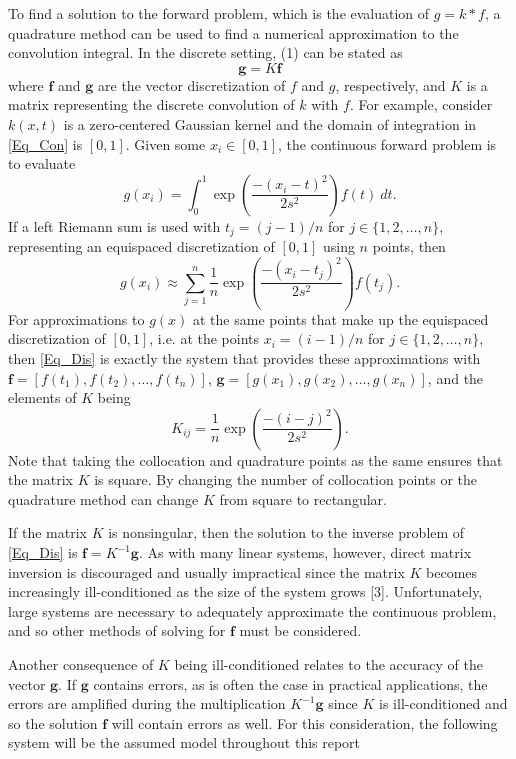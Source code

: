 \documentclass[12pt]{article}
\newcommand{\gcon}{g}
\newcommand{\kcon}{k}
\newcommand{\fcon}{f}
\newcommand{\gdis}{\mathbf{g}}
\newcommand{\kmat}{K}	%
\newcommand{\fdis}{\mathbf{f}}
\newcommand{\SD}{s}	%
\begin{document}
To find a solution to the forward problem, which is the evaluation of $\gcon = \kcon * \fcon$, a quadrature method can be used to find a numerical approximation to the convolution integral. In the discrete setting, (1) can be stated as
\begin{equation}
\gdis = \kmat\fdis
\label{Eq_Dis}
\end{equation}
where $\fdis$ and $\gdis$ are the vector discretization of $\fcon$ and $\gcon$, respectively, and $\kmat$ is a matrix representing the discrete convolution of $\kcon$ with $\fcon$. For example, consider $\kcon(x,t)$ is a zero-centered Gaussian kernel and the domain of integration in \eqref{Eq_Con} is $[0,1]$. Given some $x_i \in [0,1]$, the continuous forward problem is to evaluate
\[g(x_i) = \int_0^1 \exp\left(\frac{-(x_i - t)^2}{2\SD^2}\right)\fcon(t) \: dt.\]
If a left Riemann sum is used with $t_j = (j-1)/n$ for $j \in \{1,2,\ldots,n\}$, representing an equispaced discretization of $[0,1]$ using $n$ points, then
\[g(x_i) \approx \sum_{j=1}^n \frac{1}{n}\exp\left(\frac{-(x_i - t_j)^2}{2\SD^2}\right)\fcon(t_j).\]
For approximations to $\gcon(x)$ at the same points that make up the equispaced discretization of $[0,1]$, i.e. at the points $x_i = (i-1)/n$ for $j \in \{1,2,\ldots,n\}$, then \eqref{Eq_Dis} is exactly the system that provides these approximations with $\fdis = [\fcon(t_1),\fcon(t_2),\ldots,\fcon(t_n)]$, $\gdis = [\gcon(x_1),\gcon(x_2),\ldots,\gcon(x_n)]$, and the elements of $\kmat$ being
\[K_{ij} = \frac{1}{n}\exp\left(\frac{-(i - j)^2}{2\SD^2}\right).\]
Note that taking the collocation and quadrature points as the same ensures that the matrix $\kmat$ is square. By changing the number of collocation points or the quadrature method can change $\kmat$ from square to rectangular. \par
If the matrix $\kmat$ is nonsingular, then the solution to the inverse problem of \eqref{Eq_Dis} is $\fdis = \kmat^{-1}\gdis$. As with many linear systems, however, direct matrix inversion is discouraged and usually impractical since the matrix $\kmat$ becomes increasingly ill-conditioned as the size of the system grows [3]. Unfortunately, large systems are necessary to adequately approximate the continuous problem, and so other methods of solving for $\fdis$ must be considered. \par
Another consequence of $\kmat$ being ill-conditioned relates to the accuracy of the vector $\gdis$. If $\gdis$ contains errors, as is often the case in practical applications, the errors are amplified during the multiplication $\kmat^{-1}\gdis$ since $\kmat$ is ill-conditioned and so the solution $\fdis$ will contain errors as well. For this consideration, the following system will be the assumed model throughout this report
\end{document}
